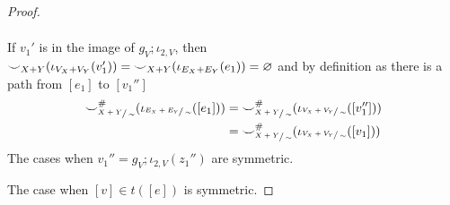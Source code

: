 \begin{proof}
\begin{itemize}
\begin{itemize}
\begin{itemize}
\begin{align*}
                              \end{align*}
                              If $v_1'$ is in the image of $g_{V};\iota_{2,V}$, then ${\smile}_{X+Y}(\iota_{V_{X} + V_{Y}}(v_1')) = {\smile}_{X+Y}(\iota_{E_{X} + E_{Y}}(e_1)) = \varnothing$ and by definition as there is a path from $[e_1]$ to $[v_1'']$
                              \begin{align*}
                                {\smile}_{\sfrac{X+Y}{\sim}}^{{\#}}(\iota_{\sfrac{E_{X} + E_{Y}}{\sim}}([e_1])) &= {\smile}_{\sfrac{X+Y}{\sim}}^{{\#}}(\iota_{\sfrac{V_{X} + V_{Y}}{\sim}}([v_1'']))\\ 
                                                                                                                        &= {\smile}_{\sfrac{X+Y}{\sim}}^{{\#}}(\iota_{\sfrac{V_{X} + V_{Y}}{\sim}}([v_1]))
                              \end{align*}
                              The cases when $v_1'' = g_{V};\iota_{2,V}(z_1'')$ are symmetric.
                    \end{itemize}
                \end{itemize}
     \end{itemize}
The case when $[v] \in t([e])$ is symmetric.
\end{proof}

